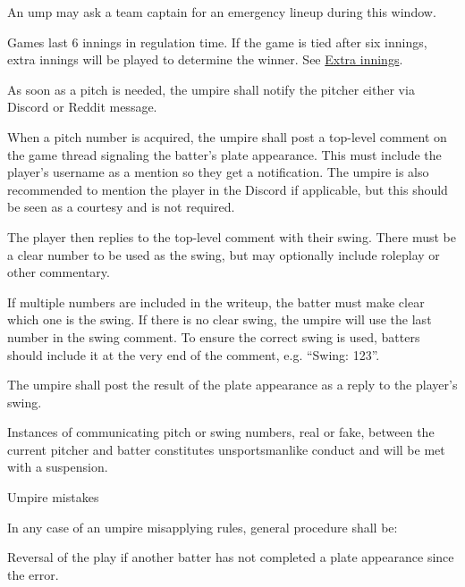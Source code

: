 \begin{deepEnumerate}
\begin{deepEnumerate}
\begin{deepEnumerate}
\begin{deepEnumerate}
\begin{deepEnumerate}
\begin{deepEnumerate}
						\item An ump may ask a team captain for an emergency lineup during this window.
					\end{deepEnumerate}
				\end{deepEnumerate}
			\end{deepEnumerate}
		\end{deepEnumerate}
		\item Games last 6 innings in regulation time. 
		If the game is tied after six innings, extra innings will be played to determine the winner. 
		See \hyperref[sec:extra innings]{Extra innings}.
		\item As soon as a pitch is needed, the umpire shall notify the pitcher either via Discord or Reddit message.
		\item When a pitch number is acquired, 
		the umpire shall post a top-level comment on the game thread signaling the batter’s plate appearance. 
		This must include the player’s username as a mention so they get a notification. 
		The umpire is also recommended to mention the player in the Discord if applicable, 
		but this should be seen as a courtesy and is not required.
		\item The player then replies to the top-level comment with their swing. 
		There must be a clear number to be used as the swing, but may optionally include roleplay or other commentary.
		\begin{deepEnumerate}
			\item If multiple numbers are included in the writeup, the batter must make clear which one is the swing. 
			If there is no clear swing, the umpire will use the last number in the swing comment. 
			To ensure the correct swing is used, batters should include it at the very end of the comment, 
			e.g. “Swing: 123”.
		\end{deepEnumerate}
		\item The umpire shall post the result of the plate appearance as a reply to the player’s swing.
		\item Instances of communicating pitch or swing numbers, real or fake, 
		between the current pitcher and batter constitutes unsportsmanlike conduct and will be met with a suspension.
		\item Umpire mistakes
		\begin{deepEnumerate}
			\item In any case of an umpire misapplying rules, general procedure shall be:
			\begin{deepEnumerate}
				\item Reversal of the play if another batter has not completed a plate appearance since the error.

\end{deepEnumerate}
\end{deepEnumerate}
\end{deepEnumerate}
\end{deepEnumerate}
